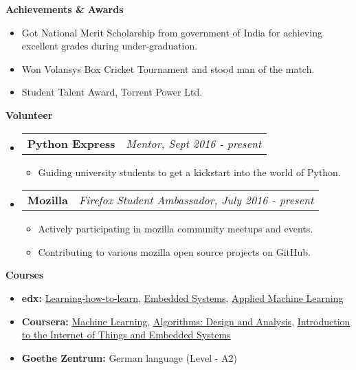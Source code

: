 \documentclass[letterpaper,10pt]{article}
\makeatletter
\newcommand{\resitem}[1]{\item #1 \vspace{-2pt}}
\newcommand{\resheading}[1]{{\large \colorbox{mygrey}{\begin{minipage}{\textwidth}{\textbf{#1 \vphantom{p\^{E}}}}\end{minipage}}}}
\newcommand{\ressubheading}[4]{
\begin{tabular*}{7.0in}{l@{\extracolsep{\fill}}r}
		\textbf{#1} & \textit{#4} \\
\end{tabular*}\vspace{-6pt}}
\makeatother
\begin{document}
\resheading{Achievements \& Awards}
\begin{itemize}
	\item Got National Merit Scholarship from government of India for achieving excellent grades during under-graduation.
	\item Won Volansys Box Cricket Tournament and stood man of the match.
	\item Student Talent Award, Torrent Power Ltd.
\end{itemize}

\resheading{Volunteer}
\begin{itemize}

\item
	\ressubheading{Python Express}{Remote}{Mentor}{Mentor, Sept 2016 - present}
	\begin{itemize}
		\resitem{Guiding university students to get a kickstart into the world of Python.}
	\end{itemize}
	
\item
	\ressubheading{Mozilla}{Remote}{Firefox Student Ambassador}{Firefox Student Ambassador, July 2016 - present}
	\begin{itemize}
		\resitem{Actively participating in mozilla community meetups and events.}
		\resitem{Contributing to various mozilla open source projects on GitHub.}
	\end{itemize}
	
\end{itemize}

\resheading{Courses}
    \begin{itemize}
        \item \textbf{edx:} \href{https://www.coursera.org/learn/learning-how-to-learn}
                            {Learning-how-to-learn},
        \href{https://www.edx.org/course/embedded-systems-shape-world-utaustinx-ut-6-03x}
                            {Embedded Systems},
        \href{https://courses.edx.org/courses/course-v1:Microsoft+DAT203.3x+5T2016/info}{Applied Machine Learning}
                                    
        \item \textbf{Coursera:}                            \href{https://www.coursera.org/learn/machine-learning}{Machine Learning},
        \href{https://www.coursera.org/specializations/algorithms}{Algorithms: Design and Analysis},
        \href{https://www.coursera.org/learn/iot}{Introduction to the Internet of Things and Embedded Systems}
                                 
        \item \textbf{Goethe Zentrum:} German language (Level - A2)
    \end{itemize}
    
\end{document}
